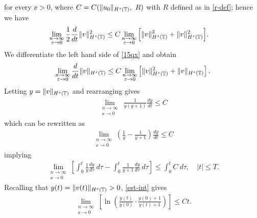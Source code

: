 for every $\ee > 0$, where $C = C(\|u_0\|_{H^s(\mathbb{T})}, \ R)$ with
$R$ defined as in \eqref{r-def}; hence we have
\begin{equation}
\begin{split}
\lim_{\substack{n \to \infty \\ \varepsilon \to 0} }
\frac{1}{2}\frac{d}{dt}\|v\|_{H^{s}(\mathbb{T})}^2
& \le C
\lim_{\substack{n \to \infty \\ \varepsilon \to 0}}
\Big [\|v\|_{H^s(\mathbb{T})}^3 + 
\|v\|_{H^s(\mathbb{T})}^2 \Big ].
\label{15qx}
\end{split}
\end{equation}
We differentiate the left hand side of \eqref{15qx} and obtain
\begin{equation*}
\begin{split}
\lim_{\substack{n \to \infty \\ \varepsilon \to 0}}\frac{d}{dt}
\|v\|_{H^s(\mathbb{T})} \le C
\lim_{\substack{n \to \infty \\ \varepsilon \to 0}} \left [\|v\|_{H^s(\mathbb{T})}^2 +
\|v\|_{H^s(\mathbb{T})} \right ].
\end{split}
\end{equation*}
Letting $y = \|v\|_{H^s(\mathbb{T})}$ and rearranging gives
\begin{equation*}
\begin{split}
\lim_{\substack{n \to \infty \\ \ee \to 0} } \ \frac{1}{y(y+1)} \frac{dy}{dt}
\le	C
\end{split}
\end{equation*}
which can be rewritten as
\begin{equation*}
\begin{split}
\lim_{\substack{n \to \infty \\ \ee \to 0} }
\left( \frac{1}{y} - \frac{1}{y+1} \right)\frac{dy}{dt} \le C 
\end{split}
\end{equation*}
implying
\begin{equation}
\label{est-int}
\begin{split}
\lim_{\substack{n \to \infty \\ \ee \to 0} } \left [
\int_0^t \frac{1}{y} \frac{dy}{d \tau} \ d \tau
- \int_0^t \frac{1}{y+1} \frac{dy}{d \tau} \ d \tau \right ]
\le \int_0^t C \ d \tau, \quad |t| \le T.
\end{split}
\end{equation}
Recalling that $y(t) = \|v(t)\|_{H^s(\mathbb{T})} > 0$, \eqref{est-int} gives 
\begin{equation}
\begin{split}
\lim_{\substack{n \to \infty \\ \ee \to 0} }
\left [ \ln \left ( \frac{y(t)}{y(0)}
\cdot \frac{y(0) + 1}{y(t) + 1} \right ) \right ] \le C t.
\label{301'qx}
\end{split}
\end{equation}
